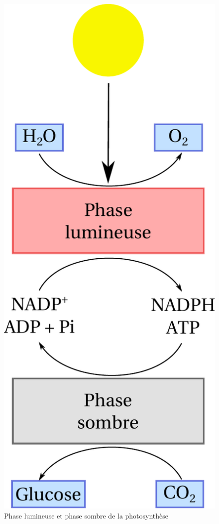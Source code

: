\begin{figure}[ht]
\centering
\includegraphics[scale=0.5]{img/ch2_photosynthese}
\caption{Phase lumineuse et phase sombre de la photosynthèse \cite{leninger1993principles}}
\label{photosynthese}
\end{figure}

